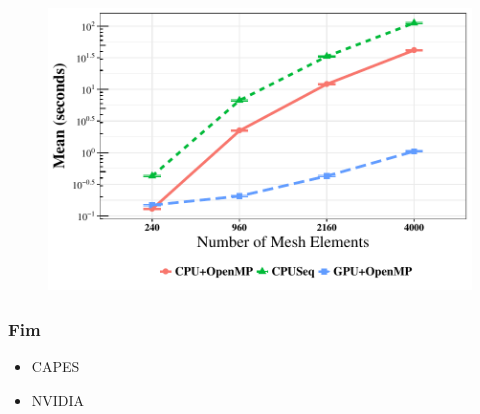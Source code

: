 \documentclass{beamer}
\begin{document}
\begin{frame}

\begin{figure}[ht]
\centering
\includegraphics[scale=0.7]{results1.pdf}
\label{fig:graphic1}
\end{figure}

\end{frame}

\begin{frame}
\frametitle{Fim}
\scriptsize
\begin{itemize}
	\item CAPES
	\item NVIDIA
\end{itemize}
\normalsize
\end{frame}
\end{document}

